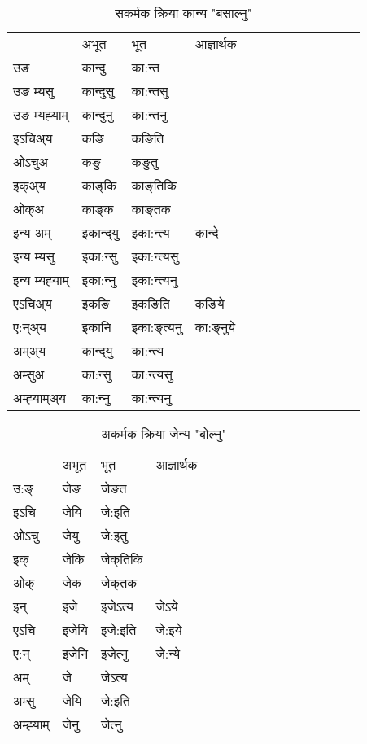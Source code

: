 \begin{table}[H]
\centering
\caption{\label{aŋt.vt} सकर्मक क्रिया  कान्य  "बसाल्नु"  }
\begin{tabular}{l|l|l|l|l|l|l|l|l|l|l|l|l}  \toprule
&अभूत & भूत & आज्ञार्थक \\ 
उङ &कान्दु &का:न्त \\ 
उङ म्यसु &कान्दुसु &का:न्तसु \\ 
उङ म्यह्‍याम् &कान्दुनु &का:न्तनु \\ 
इऽचिअ्य &कङि &कङिति   \\ 
ओऽचुअ &कङु &कङुतु   \\ 
इक्अ्य &काङ्‌कि &काङ्‌तिकि   \\ 
ओक्अ &काङ्‌क &काङ्‌तक   \\ 
इन्य अम् & इकान्द्‌यु  & इका:न्त्य &कान्दे  \\ 
इन्य म्यसु & इका:न्सु  & इका:न्त्यसु   \\ 
इन्य म्यह्‍याम् & इका:न्‍नु  & इका:न्त्यनु   \\ 
एऽचिअ्य & इकङि & इकङिति &कङिये    \\ 
ए:न्अ्य & इकानि  & इका:ङ्‌त्यनु &का:ङ्‌नुये  \\ 
अम्अ्य & कान्द्‌यु  & का:न्त्य  \\ 
अम्सुअ & का:न्सु & का:न्त्यसु  \\ 
अम्ह्‍याम्अ्य & का:न्‍नु  & का:न्त्यनु \\ 
\bottomrule
\end{tabular}
\end{table}


\begin{table}[H]
\centering
\caption{\label{e.vi} अकर्मक क्रिया  जेन्य  "बोल्नु"  }
\begin{tabular}{l|l|l|l|l|l|l|l|l|l|l|l|l}  \toprule
&अभूत & भूत & आज्ञार्थक \\ 
उ:ङ्‌ &जेङ &जेङत \\ 
इऽचि &जेयि &जे:इति   \\ 
ओऽचु &जेयु &जे:इतु   \\ 
इक् &जेकि &जेक्‌तिकि   \\ 
ओक् &जेक &जेक्‌तक   \\ 
इन् & इजे & इजेऽत्य &जेऽये  \\ 
एऽचि & इजेयि & इजे:इति &जे:इये    \\ 
ए:न् & इजेनि  & इजेत्‍नु &जे:न्ये  \\ 
अम् & जे & जेऽत्य   \\ 
अम्सु & जेयि & जे:इति     \\ 
अम्ह्‍याम् & जेनु  & जेत्‍नु \\ 
\bottomrule
\end{tabular}
\end{table}


